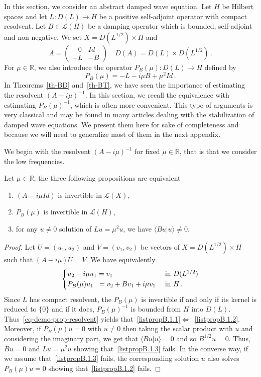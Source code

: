 \documentclass[10pt]{amsart}
\theoremstyle{definition}\newtheorem{defi}[theo]{Definition}\newtheorem{rema}[theo]{Remark}\newtheorem{exam}[theo]{Example}\newtheorem{exem}[theo]{Example}\newtheorem{nota}[theo]{Notation}
\newcommand{\RR}{\mathbb{R}}
\newcommand{\Lc}{\mathcal{L}}
\newcommand*{\romanenumi}{\renewcommand*{\theenumi}{\roman{enumi}}}
\begin{document}
In this section, we consider an abstract damped wave equation. Let $H$ be Hilbert spaces and let $L:D(L)\rightarrow H$ be a positive self-adjoint operator with compact resolvent. Let $B\in\Lc(H)$ be a damping operator which is bounded, self-adjoint and non-negative. We set $X=D(L^{1/2})\times H$ and
\[
A=
\begin{pmatrix}
 \;\;\;0 & Id \\ -L & -B
\end{pmatrix}\quad D(A)=D(L)\times D(L^{1/2})\,.
\]
For $\mu\in\RR$, we also introduce the operator $P_B(\mu):D(L)\rightarrow H$ defined by
\[
P_B(\mu)=-L-i\mu B +\mu^2 Id\,.
\]
In Theorems~\ref{th-BD} and~\ref{th-BT}, we have seen the importance of estimating the resolvent $(A-i\mu)^{-1}$. In this section, we recall the equivalence with estimating $P_B(\mu)^{-1}$, which is often more convenient. This type of arguments is very classical and may be found in many articles dealing with the stabilization of damped wave equations. We present them here for sake of completeness and because we will need to generalize most of them in the next appendix.

We begin with the resolvent $(A-i\mu)^{-1}$ for fixed $\mu\in\RR$, that is that we consider the low frequencies.

\begin{prop}\label{prop-resolvent}
Let $\mu\in\RR$, the three following propositions are equivalent
\begin{enumerate}\romanenumi
\item \label{listpropB.1.1}$(A-i\mu Id)$ is invertible in $\Lc(X)$,
\item \label{listpropB.1.2}$P_B(\mu)$ is invertible in $\Lc(H)$,
\item \label{listpropB.1.3}for any $u\neq 0$ solution of $Lu=\mu^2 u$, we have $\langle Bu|u\rangle\neq 0$.
\end{enumerate}
\end{prop}
\begin{proof}
Let $U=(u_1,u_2)$ and $V=(v_1,v_2)$ be vectors of $X= D(L^{1/2})\times H$ such that $(A- i\mu)U=V$. We have equivalently
\begin{equation}\label{eq-demo-prop-resolvent}
\begin{cases}
u_2 -i\mu u_1 = v_1 & \text{ in }D(L^{1/2})\\
P_B(\mu) u_1 \mkern 10mu = v_2 + B v_1 + i \mu v_1&\text{ in }H\,.
\end{cases}
\end{equation}
Since $L$ has compact resolvent, the $P_B(\mu)$ is invertible if and only if its kernel is reduced to $\{0\}$ and if it does, $P_B(\mu)^{-1}$ is bounded from $H$ into $D(L)$. Thus~\eqref{eq-demo-prop-resolvent} yields that~\eqref{listpropB.1.1}$\Leftrightarrow$~\eqref{listpropB.1.2}. Moreover, if $P_B(\mu)u=0$ with $u\neq 0$ then taking the scalar product with $u$ and considering the imaginary part, we get that $\langle Bu|u\rangle=0$ and so $B^{1/2}u=0$. Thus, $Bu=0$ and $Lu=\mu^2 u$ showing that~\eqref{listpropB.1.3} fails. In the converse way, if we assume that~\eqref{listpropB.1.3} fails, the corresponding solution $u$ also solves $P_B(\mu)u=0$ showing that~\eqref{listpropB.1.2} fails.
\end{proof}
\end{document}
